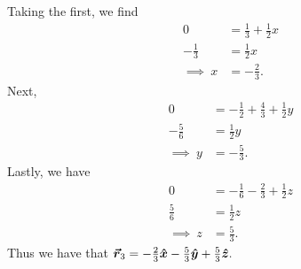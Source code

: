 \documentclass[12pt]{article} %
\begin{document}
\begin{solution}
Taking the first, we find
\begin{align*}
    0&= \frac{1}{3} +\frac{1}{2}x\\
    -\frac{1}{3}&= \frac{1}{2}x\\
    \implies~ x&= -\frac{2}{3}.
\end{align*}
Next,
\begin{align*}
    0&= -\frac{1}{2} +\frac{4}{3}+\frac{1}{2}y\\
    -\frac{5}{6}&= \frac{1}{2}y\\
    \implies~ y&= -\frac{5}{3}.
\end{align*}
Lastly, we have
\begin{align*}
    0&= -\frac{1}{6}-\frac{2}{3} +\frac{1}{2}z\\
    \frac{5}{6} &= \frac{1}{2}z\\
    \implies~ z&= \frac{5}{3}.
\end{align*}
Thus we have that $\boldsymbol{\vec{r}}_3 = -\frac{2}{3} \boldsymbol{\hat{x}} - \frac{5}{3}\boldsymbol{\hat{y}} + \frac{5}{3}\boldsymbol{\hat{z}}.$
\end{solution}
\end{document}
